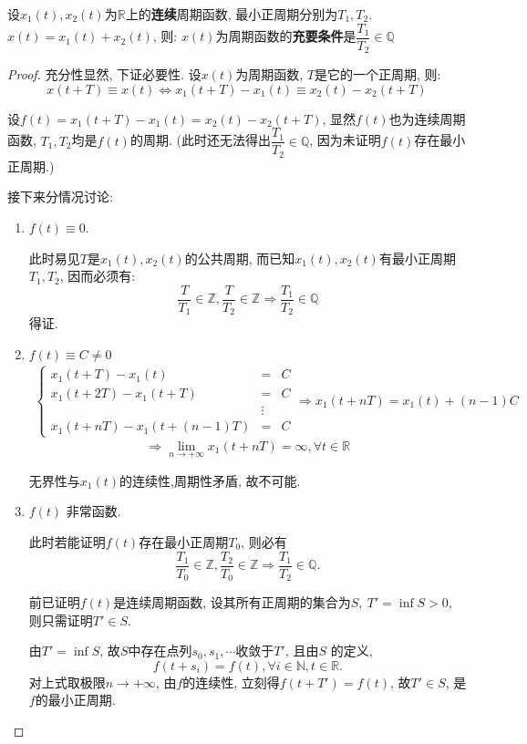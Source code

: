 
设$ x_1(t), x_2(t)$为$\mathbb{R}$上的\textbf{连续}周期函数, 最小正周期分别为$ T_1, T_2$.
$x(t) = x_1(t) + x_2(t)$, 则:
$x(t) $为周期函数的\textbf{充要条件}是$\dfrac{T_1}{T_2} \in \mathbb{Q}$


\begin{proof}
  充分性显然, 下证必要性.
  设$x(t)$为周期函数, $T$是它的一个正周期, 则:
  \[ x(t+T) \equiv x(t) \Leftrightarrow x_1(t+T) - x_1(t) \equiv x_2(t) - x_2(t+T)\]

设$ f(t) = x_1(t+T) - x_1(t) = x_2(t) - x_2(t+T) $,
显然$ f(t)$也为连续周期函数, $ T_1, T_2$均是$ f(t)$的周期.
(此时还无法得出$ \dfrac{T_1}{T_2}\in \mathbb{Q}$, 因为未证明$ f(t)$存在最小正周期.)

接下来分情况讨论:
\begin{enumerate}
  \item $f(t) \equiv 0 $.

    此时易见$T $是$ x_1(t), x_2(t)$的公共周期, 而已知$x_1(t), x_2(t) $有最小正周期$T_1, T_2 $, 因而必须有:
    \[ \dfrac{T}{T_1} \in \mathbb{Z}, \dfrac{T}{T_2} \in \mathbb{Z} \Rightarrow \dfrac{T_1}{T_2} \in \mathbb{Q}\]
  得证.

\item $f(t) \equiv C \neq 0$
  \begin{align*}
    \left \{
      \begin{array}{lll}
    x_1(t+T) - x_1(t) &=& C \\
    x_1(t+2T) - x_1(t + T) &=& C \\
    &\vdots \\
    x_1(t+nT) - x_1(t +(n-1) T) &=& C
      \end{array}
    \right. \Rightarrow  x_1(t+nT) = x_1(t) + (n-1)C
  \end{align*}
  \[ \Rightarrow \lim\limits_{n\to+\infty}x_1(t+nT) = \infty, \forall t \in \mathbb{R} \]

无界性与$x_1(t) $的连续性,周期性矛盾, 故不可能.

\item $f(t) $ 非常函数.

  此时若能证明$f(t)$存在最小正周期$T_0$, 则必有
  \[ \dfrac{T_1}{T_0} \in \mathbb{Z}, \dfrac{T_2}{T_0} \in \mathbb{Z} \Rightarrow \dfrac{T_1}{T_2} \in \mathbb{Q}.\]

前已证明$ f(t)$是连续周期函数, 设其所有正周期的集合为$ S,\  T' = \inf S > 0$, 则只需证明$ T' \in S$.

由$ T' = \inf S$, 故$S$中存在点列$s_0, s_1,\cdots $收敛于$ T'$, 且由$S$ 的定义,
\[  f(t+s_i) = f(t), \forall i \in \mathbb{N}, t \in \mathbb{R}.  \]
对上式取极限$n\to +\infty$, 由$f$的连续性, 立刻得$ f(t+T') = f(t)$, 故$ T' \in S$, 是$f$的最小正周期.
\end{enumerate}

\end{proof}

